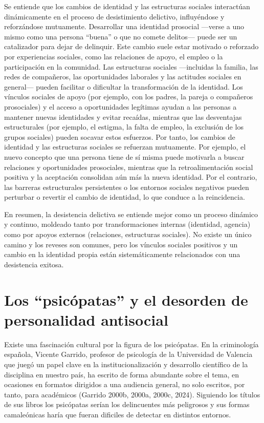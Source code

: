 \documentclass[
  spanish,
  letterpaper,
  DIV=11,
  numbers=noendperiod]{scrreprt}
\begin{document}
Se entiende que los cambios de identidad y las estructuras sociales
interactúan dinámicamente en el proceso de desistimiento delictivo,
influyéndose y reforzándose mutuamente. Desarrollar una identidad
prosocial ---verse a uno mismo como una persona ``buena'' o que no
comete delitos--- puede ser un catalizador para dejar de delinquir. Este
cambio suele estar motivado o reforzado por experiencias sociales, como
las relaciones de apoyo, el empleo o la participación en la comunidad.
Las estructuras sociales ---incluidas la familia, las redes de
compañeros, las oportunidades laborales y las actitudes sociales en
general--- pueden facilitar o dificultar la transformación de la
identidad. Los vínculos sociales de apoyo (por ejemplo, con los padres,
la pareja o compañeros prosociales) y el acceso a oportunidades
legítimas ayudan a las personas a mantener nuevas identidades y evitar
recaídas, mientras que las desventajas estructurales (por ejemplo, el
estigma, la falta de empleo, la exclusión de los grupos sociales) pueden
socavar estos esfuerzos. Por tanto, los cambios de identidad y las
estructuras sociales se refuerzan mutuamente. Por ejemplo, el nuevo
concepto que una persona tiene de sí misma puede motivarla a buscar
relaciones y oportunidades prosociales, mientras que la
retroalimentación social positiva y la aceptación consolidan aún más la
nueva identidad. Por el contrario, las barreras estructurales
persistentes o los entornos sociales negativos pueden perturbar o
revertir el cambio de identidad, lo que conduce a la reincidencia.

En resumen, la desistencia delictiva se entiende mejor como un proceso
dinámico y continuo, moldeado tanto por transformaciones internas
(identidad, agencia) como por apoyos externos (relaciones, estructuras
sociales). No existe un único camino y los reveses son comunes, pero los
vínculos sociales positivos y un cambio en la identidad propia están
sistemáticamente relacionados con una desistencia exitosa.

\section{Los ``psicópatas'' y el desorden de personalidad
antisocial}\label{los-psicuxf3patas-y-el-desorden-de-personalidad-antisocial}

Existe una fascinación cultural por la figura de los psicópatas. En la
criminología española, Vicente Garrido, profesor de psicología de la
Universidad de Valencia que juegó un papel clave en la
institucionalización y desarrollo científico de la disciplina en nuestro
país, ha escrito de forma abundante sobre el tema, en ocasiones en
formatos dirigidos a una audiencia general, no solo escritos, por tanto,
para académicos (Garrido 2000b, 2000a, 2000c, 2024). Siguiendo los
títulos de sus libros los psicópatas serían los delincuentes más
peligrosos y sus formas camaleónicas haría que fueran dificiles de
detectar en distintos entornos.
\end{document}
